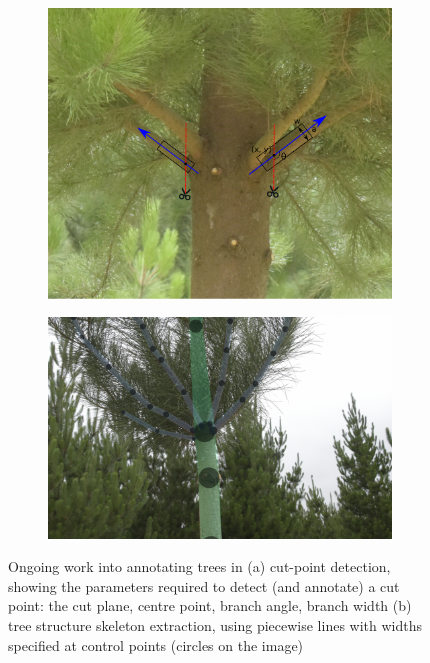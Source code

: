 \begin{figure}[htb!]
\begin{subfigure}[t]{0.5\linewidth}
  \centering
  \includegraphics[height=0.25\textheight]{figures/future/tree_cutpoint.pdf}
  \caption{} 
\end{subfigure}%
\begin{subfigure}[t]{0.5\linewidth}
  \centering
  \includegraphics[height=0.25\textheight]{figures/future/tree_branches.jpg}
  \caption{} 
\end{subfigure}
\caption{Ongoing work into annotating trees in (a) cut-point detection, showing the parameters required to detect (and annotate) a cut point: the cut plane, centre point, branch angle, branch width (b) tree structure skeleton extraction, using piecewise lines with widths specified at control points (circles on the image) }
\label {fig:future_trees}
\end{figure}

